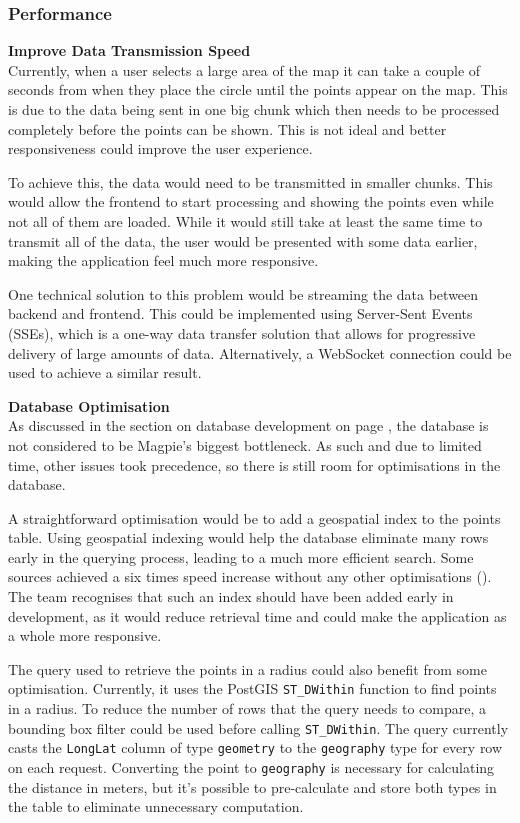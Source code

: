 \subsubsection{Performance}
\textbf{Improve Data Transmission Speed}\\
Currently, when a user selects a large area of the map it can take a couple of
seconds from when they place the circle until the points appear on the map. This
is due to the data being sent in one big chunk which then needs to be processed
completely before the points can be shown. This is not ideal and better
responsiveness could improve the user experience.

To achieve this, the data would need to be transmitted in smaller chunks. This
would allow the frontend to start processing and showing the points even while
not all of them are loaded. While it would still take at least the same time to
transmit all of the data, the user would be presented with some data earlier,
making the application feel much more responsive.

One technical solution to this problem would be streaming the data between
backend and frontend. This could be implemented using Server{-}Sent Events
(SSEs), which is a one{-}way data transfer solution that allows for progressive
delivery of large amounts of data. Alternatively, a WebSocket connection could
be used to achieve a similar result.

\textbf{Database Optimisation}\\
As discussed in the section on database development on page
\pageref{database_development}, the database is not considered to be Magpie's
biggest bottleneck. As such and due to limited time, other issues took
precedence, so there is still room for optimisations in the database.

A straightforward optimisation would be to add a geospatial index to the points
table. Using geospatial indexing would help the database eliminate many rows
early in the querying process, leading to a much more efficient search. Some
sources achieved a six times speed increase without any other optimisations
(\cite{postgis_indexing}). The team recognises that such an index should have been
added early in development, as it would reduce retrieval time and could make the
application as a whole more responsive.

The query used to retrieve the points in a radius could also benefit from some
optimisation. Currently, it uses the PostGIS \texttt{ST\_DWithin} function to
find points in a radius. To reduce the number of rows that the query needs to
compare, a bounding box filter could be used before calling
\texttt{ST\_DWithin}. The query currently casts the \texttt{LongLat} column of
type \texttt{geometry} to the \texttt{geography} type for every row on each
request. Converting the point to \texttt{geography} is necessary for calculating
the distance in meters, but it's possible to pre{-}calculate and store both
types in the table to eliminate unnecessary computation.

